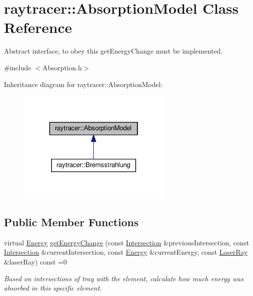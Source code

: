 \hypertarget{classraytracer_1_1AbsorptionModel}{}\section{raytracer\+:\+:Absorption\+Model Class Reference}
\label{classraytracer_1_1AbsorptionModel}


Abstract interface, to obey this get\+Energy\+Change must be implemented.  




{\ttfamily \#include $<$Absorption.\+h$>$}



Inheritance diagram for raytracer\+:\+:Absorption\+Model\+:
\nopagebreak
\begin{figure}[H]
\begin{center}
\leavevmode
\includegraphics[width=214pt]{classraytracer_1_1AbsorptionModel__inherit__graph}
\end{center}
\end{figure}
\subsection*{Public Member Functions}
\begin{DoxyCompactItemize}
\item 
virtual \hyperlink{structraytracer_1_1Energy}{Energy} \hyperlink{classraytracer_1_1AbsorptionModel_a71abeb7d444a7c3cf56dc542657cc7d2}{get\+Energy\+Change} (const \hyperlink{structraytracer_1_1Intersection}{Intersection} \&previous\+Intersection, const \hyperlink{structraytracer_1_1Intersection}{Intersection} \&current\+Intersection, const \hyperlink{structraytracer_1_1Energy}{Energy} \&current\+Energy, const \hyperlink{classraytracer_1_1LaserRay}{Laser\+Ray} \&laser\+Ray) const =0
\begin{DoxyCompactList}\small\item\em Based on intersections of tray with the element, calculate how much energy was absorbed in this specific element. \end{DoxyCompactList}\end{DoxyCompactItemize}



